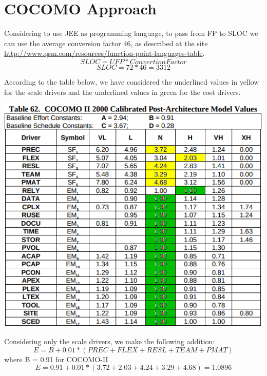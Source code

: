 \section{COCOMO Approach}
	Considering to use JEE as programming language, to pass from FP to SLOC we can use the average conversion factor 46, as described at the site \newline \url{http://www.qsm.com/resources/function-point-languages-table}. 
	$$SLOC=UFP*ConvertionFactor$$
	$$SLOC=72*46=3312$$
	
	According to the table below, we have considered the underlined values in yellow for the scale drivers and the underlined values in green for the cost drivers.
	
	\begin{center}
			\includegraphics[width=1\textwidth]{./images/drivers.png}
	\end{center}
	\newpage
	\noindent Considering only the scale drivers, we make the following addition:
	$$E=B + 0.01*(PREC+FLEX+RESL+TEAM+PMAT)$$ where B = 0.91 for COCOMO-II
	$$E=0.91+0.01*(3.72+2.03+4.24+3.29+4.68)=1.0896$$
	
